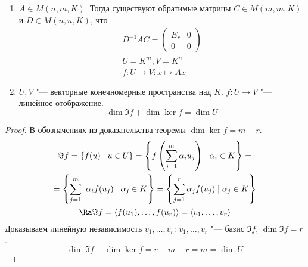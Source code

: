 \begin{conseq}
	\begin{enumerate}
	\item
		$A \in M(n, m, K)$.
		Тогда существуют обратимые матрицы $C \in M(m, m, K)$ и  $D \in M(n, n, K)$, что
		\begin{gather*}
			D^{-1}AC = \begin{pmatrix}
				E_r & 0 \\
				0   & 0
			\end{pmatrix} \\
			U = K^m, V = K^n \\
			f\colon U \to V\colon x \mapsto Ax
		\end{gather*}

	\item
		$U, V$ "--- векторные конечномерные пространства над $K$.
		$f\colon U \to V$ "--- линейное отображение.
		\[ \dim \Im f + \dim \ker f = \dim U \]
	\end{enumerate}
\end{conseq}
\begin{proof}
	В обозначениях из доказательства теоремы $\dim \ker f = m - r$.
	\begin{gather*}
		\Im f = \{f(u) \mid u \in U\} = \left\{f\left(\sum_{j=1}^m \alpha_i u_j\right) \mid \alpha_i \in K\right\} = \\
		= \left\{\sum_{j=1}^m\ \alpha_i f(u_j) \mid \alpha_j \in K\right\} = \left\{\sum_{j=1}^r \alpha_j f(u_j) \mid \alpha_j \in K\right\} \\
		\Ra \Im f = \left<f(u_1), \dots, f(u_r)\right> = \left<v_1, \dots, v_r\right>
	\end{gather*}
	Доказываем линейную независимость $v_1, \dots, v_r$:
	$v_1, \dots, v_r$ "--- базис $\Im f$, $\dim \Im f = r$.
	\[ \dim \Im f + \dim \ker f = r + m - r = m = \dim U \]
\end{proof}
